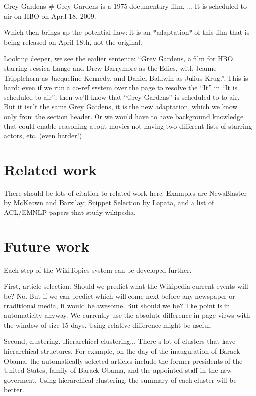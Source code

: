 \documentclass[11pt]{article}
\newcommand{\war}[1]{{\sf\small #1}}
\begin{document}
 \war{Grey Gardens} \# Grey Gardens is a 1975 documentary film. ...  It is
 scheduled to air on HBO on April 18, 2009.

 Which then brings up the potential flaw:  it is an *adaptation* of
 this film that is being released on April 18th, not the original.

 Looking deeper, we see the earlier sentence: ``Grey Gardens, a film for
 HBO, starring Jessica Lange and Drew Barrymore as the Edies, with
 Jeanne Tripplehorn as Jacqueline Kennedy, and Daniel Baldwin as Julius
 Krug.''.  This is hard: even if we run a co-ref system over the page to
 resolve the ``It'' in ``It is scheduled to air'', then we'll know that
 ``Grey Gardens'' is scheduled to to air.  But it isn't the same Grey
 Gardens, it is the new adaptation, which we know only from the section
 header.  Or we would have to have background knowledge that could
 enable reasoning about movies not having two different lists of
 starring actors, etc. (even harder!)


\section{Related work}
\label{sec:related-work}

There should be lots of citation to related work here. Examples are NewsBlaster by McKeown and Barzilay; Snippet Selection by Lapata, and a list of ACL/EMNLP papers that study wikipedia.

\section{Future work}

Each step of the WikiTopics system can be developed further.

First, article selection.
Should we predict what the Wikipedia current events will be?
No.
But if we can predict which will come next before any newspaper or traditional media, it would be awesome.
But should we be? The point is in automaticity anyway.
We currently use the absolute difference in page views with the window of size 15-days.
Using relative difference might be useful.

Second, clustering.
Hierarchical clustering... There a lot of clusters that have hierarchical structures. For example, on the day of the
inauguration of Barack Obama, the automatically selected articles include
the former presidents of the United States, family of Barack Obama,
and the appointed staff in the new goverment.
Using hierarchical clustering, the summary of each cluster will be better.
\end{document}
